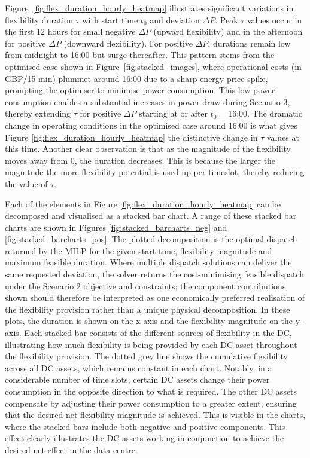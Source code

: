 \documentclass[lettersize,journal]{IEEEtran}
\newcommand{\rev}[1]{\textcolor{blue!70!black}{#1}}
\begin{document}
Figure~\ref{fig:flex_duration_hourly_heatmap} illustrates significant variations in flexibility duration $\tau$ with start time $t_0$ and deviation $\Delta P$. Peak $\tau$ values occur in the first 12 hours for small negative $\Delta P$ (upward flexibility) and in the afternoon for positive $\Delta P$ (downward flexibility). For positive $\Delta P$, durations remain low from midnight to 16:00 but surge thereafter.
This pattern stems from the optimised case shown in Figure~\ref{fig:stacked_images}, where operational costs (in GBP/15 min) plummet around 16:00 due to a sharp energy price spike, prompting the optimiser to minimise power consumption. This low power consumption enables a substantial increases in power draw during Scenario 3, thereby extending $\tau$ for positive $\Delta P$ starting at or after $t_0 = $16:00. The dramatic change in operating conditions in the optimised case around 16:00 is what gives Figure \ref{fig:flex_duration_hourly_heatmap} the distinctive change in $\tau$ values at this time. Another clear observation is that as the magnitude of the flexibility moves away from 0, the duration decreases. This is because the larger the magnitude the more flexibility potential is used up per timeslot, thereby reducing the value of $\tau$.

Each of the elements in Figure \ref{fig:flex_duration_hourly_heatmap} can be decomposed and visualised as a stacked bar chart. A range of these stacked bar charts are shown in Figures \ref{fig:stacked_barcharts_neg} and \ref{fig:stacked_barcharts_pos}. \rev{The plotted decomposition is the optimal dispatch returned by the MILP for the given start time, flexibility magnitude and maximum feasible duration. Where multiple dispatch solutions can deliver the same requested deviation, the solver returns the cost-minimising feasible dispatch under the Scenario 2 objective and constraints; the component contributions shown should therefore be interpreted as one economically preferred realisation of the flexibility provision rather than a unique physical decomposition.} In these plots, the duration is shown on the x-axis and the flexibility magnitude on the y-axis. Each stacked bar consists of the different sources of flexibility in the DC, illustrating how much flexibility is being provided by each DC asset throughout the flexibility provision. The dotted grey line shows the cumulative flexibility across all DC assets, which remains constant in each chart. Notably, in a considerable number of time slots, certain DC assets change their power consumption in the opposite direction to what is required. The other DC assets compensate by adjusting their power consumption to a greater extent, ensuring that the desired net flexibility magnitude is achieved. This is visible in the charts, where the stacked bars include both negative and positive components. This effect clearly illustrates the DC assets working in conjunction to achieve the desired net effect in the data centre.
\end{document}
